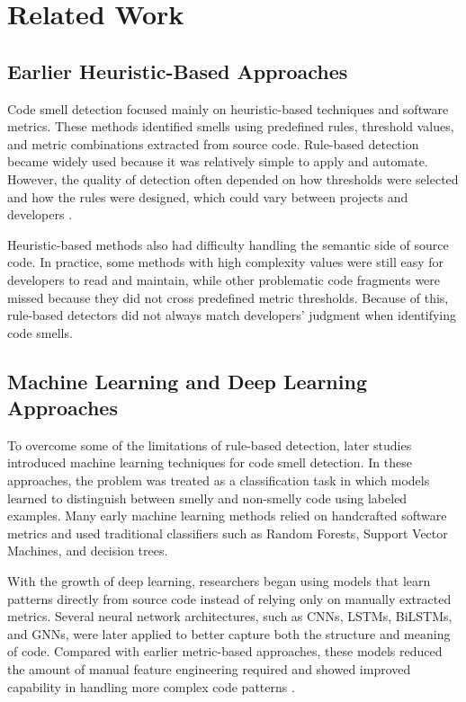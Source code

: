 \section{Related Work}
\label{sec:related-work}

\subsection{Earlier Heuristic-Based Approaches}

Code smell detection focused mainly on heuristic-based techniques and software metrics. These methods identified smells using predefined rules, threshold values, and metric combinations extracted from source code. Rule-based detection became widely used because it was relatively simple to apply and automate. However, the quality of detection often depended on how thresholds were selected and how the rules were designed, which could vary between projects and developers \cite{mesbah2025nlp,zhang2024peftsmells}.

Heuristic-based methods also had difficulty handling the semantic side of source code. In practice, some methods with high complexity values were still easy for developers to read and maintain, while other problematic code fragments were missed because they did not cross predefined metric thresholds. Because of this, rule-based detectors did not always match developers’ judgment when identifying code smells.

\subsection{Machine Learning and Deep Learning Approaches}

To overcome some of the limitations of rule-based detection, later studies introduced machine learning techniques for code smell detection. In these approaches, the problem was treated as a classification task in which models learned to distinguish between smelly and non-smelly code using labeled examples. Many early machine learning methods relied on handcrafted software metrics and used traditional classifiers such as Random Forests, Support Vector Machines, and decision trees.

With the growth of deep learning, researchers began using models that learn patterns directly from source code instead of relying only on manually extracted metrics. Several neural network architectures, such as CNNs, LSTMs, BiLSTMs, and GNNs, were later applied to better capture both the structure and meaning of code. Compared with earlier metric-based approaches, these models reduced the amount of manual feature engineering required and showed improved capability in handling more complex code patterns \cite{mesbah2025nlp}.


